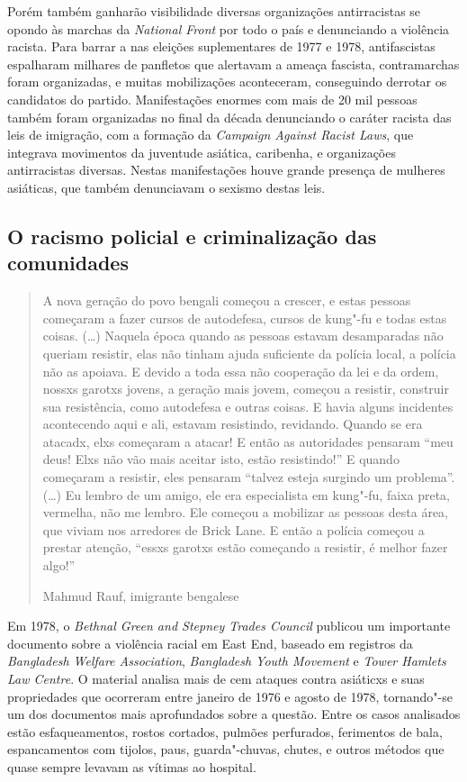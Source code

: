 Porém também ganharão visibilidade diversas organizações antirracistas se opondo às marchas da \emph{National Front} por todo o país e denunciando a violência racista. Para barrar a  nas eleições suplementares de 1977 e 1978, antifascistas espalharam milhares de panfletos que alertavam a ameaça fascista, contramarchas foram organizadas, e muitas mobilizações aconteceram, conseguindo derrotar os candidatos do partido. Manifestações enormes com mais de 20 mil pessoas também foram organizadas no final da década denunciando o caráter racista das leis de imigração, com a formação da \emph{Campaign Against Racist Laws}, que integrava movimentos da juventude asiática, caribenha, e organizações antirracistas diversas. Nestas manifestações houve grande presença de mulheres asiáticas, que também denunciavam o sexismo destas leis.

\subsection{O racismo policial e criminalização das comunidades}

\begin{quote}
A nova geração do povo bengali começou a crescer, e estas pessoas começaram a fazer cursos de autodefesa, cursos de kung"-fu e todas estas coisas. (\ldots{}) Naquela época quando as pessoas estavam desamparadas não queriam resistir, elas não tinham ajuda suficiente da polícia local, a polícia não as apoiava. E devido a toda essa não cooperação da lei e da ordem, nossxs garotxs jovens, a geração mais jovem, começou a resistir, construir sua resistência, como autodefesa e outras coisas. E havia alguns incidentes acontecendo aqui e ali, estavam resistindo, revidando. Quando se era atacadx, elxs começaram a atacar! E então as autoridades pensaram ``meu deus! Elxs não vão mais aceitar isto, estão resistindo!'' E quando começaram a resistir, eles pensaram ``talvez esteja surgindo um problema''. (\ldots{}) Eu lembro de um amigo, ele era especialista em kung"-fu, faixa preta, vermelha, não me lembro. Ele começou a mobilizar as pessoas desta área, que viviam nos arredores de Brick Lane. E então a polícia começou a prestar atenção, ``essxs garotxs estão começando a resistir, é melhor fazer algo!''

Mahmud Rauf, imigrante bengalese
\end{quote}

Em 1978, o \emph{Bethnal Green and Stepney Trades Council} publicou um importante documento sobre a violência racial em East End, baseado em registros da \emph{Bangladesh Welfare Association}, \emph{Bangladesh Youth Movement} e \emph{Tower Hamlets Law Centre}. O material analisa mais de cem ataques contra asiáticxs e suas propriedades que ocorreram entre janeiro de 1976 e agosto de 1978, tornando"-se um dos documentos mais aprofundados sobre a questão. Entre os casos analisados estão esfaqueamentos, rostos cortados, pulmões perfurados, ferimentos de bala, espancamentos com tijolos, paus, guarda"-chuvas, chutes, e outros métodos que quase sempre levavam as vítimas ao hospital.

